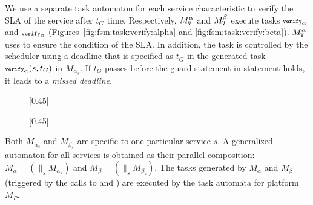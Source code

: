 We use a separate task automaton for each service characteristic to verify the SLA of the service after $t_G$ time.
Respectively, $M^{\alpha}_{{\scriptsize\texttt{V}}}$ and $M^{\beta}_{{\scriptsize\texttt{V}}}$ execute tasks ${\scriptsize\texttt{verify}}_\alpha$ and ${\scriptsize\texttt{verify}}_\beta$ (Figures~\ref{fig:fsm:task:verify:alpha} and \ref{fig:fsm:task:verify:beta}).
$M^{\alpha}_{{\scriptsize\texttt{V}}}$ uses  to ensure the condition of the SLA.
In addition, the task is controlled by the scheduler using a deadline that is specified as $t_G$ in the generated task ${\scriptsize\texttt{verify}}_\alpha(s,t_G)$ in $M_{\alpha_s}$. 
If $t_G$ passes before the guard statement in  statement holds, it leads to a \emph{missed deadline}.
\begin{figure}[h]
\vspace{-20pt}
\captionsetup[subfigure]{font=scriptsize}
\centering
{}[0.45\textwidth]{
}%
[0.45\textwidth]{
%
}
\vspace{-10pt}
\vspace{-10pt}
\end{figure}

Both $M_{\alpha_s}$ and $M_{\beta_s}$ are specific to one particular service $s$.
A generalized automaton for all services is obtained as their parallel composition:$M_\alpha = (\parallel_s M_{\alpha_s})$ and $M_\beta = (\parallel_s M_{\beta_s})$.
The tasks generated by $M_\alpha$ and $M_\beta$ (triggered by the calls to
 and ) are executed by the task automata for platform $M_P$.

